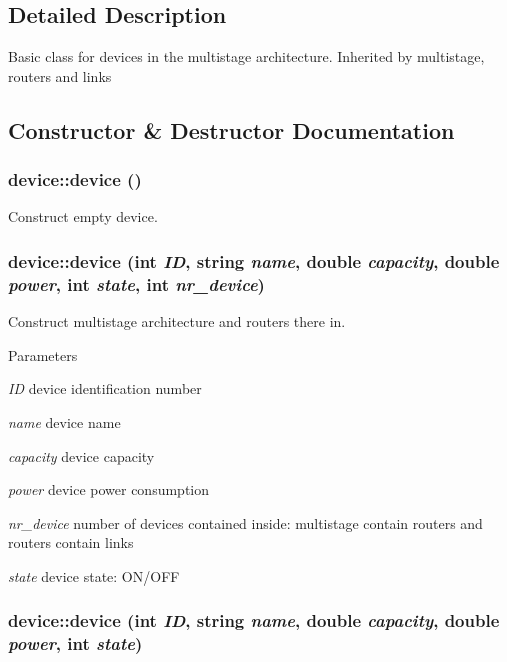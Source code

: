 \subsection{Detailed Description}
Basic class for devices in the multistage architecture. Inherited by multistage, routers and links 

\subsection{Constructor \& Destructor Documentation}
\hypertarget{classdevice_a95ab42e0b2e738637d3414347fa5559c}{
\subsubsection[{device}]{\setlength{\rightskip}{0pt plus 5cm}device::device ()}}
\label{classdevice_a95ab42e0b2e738637d3414347fa5559c}


Construct empty device. 

\hypertarget{classdevice_a57b9c4ac7a8bd970b81b1154ae79a5de}{
\subsubsection[{device}]{\setlength{\rightskip}{0pt plus 5cm}device::device (int {\em ID}, \/  string {\em name}, \/  double {\em capacity}, \/  double {\em power}, \/  int {\em state}, \/  int {\em nr\_\-device})}}
\label{classdevice_a57b9c4ac7a8bd970b81b1154ae79a5de}


Construct multistage architecture and routers there in. 


\begin{DoxyParams}{Parameters}
\item[{\em ID}]device identification number \item[{\em name}]device name \item[{\em capacity}]device capacity \item[{\em power}]device power consumption \item[{\em nr\_\-device}]number of devices contained inside: multistage contain routers and routers contain links \item[{\em state}]device state: ON/OFF \end{DoxyParams}
\hypertarget{classdevice_a3aa4a2a68f49628354dbe33de584f726}{
\subsubsection[{device}]{\setlength{\rightskip}{0pt plus 5cm}device::device (int {\em ID}, \/  string {\em name}, \/  double {\em capacity}, \/  double {\em power}, \/  int {\em state})}}
\label{classdevice_a3aa4a2a68f49628354dbe33de584f726}



